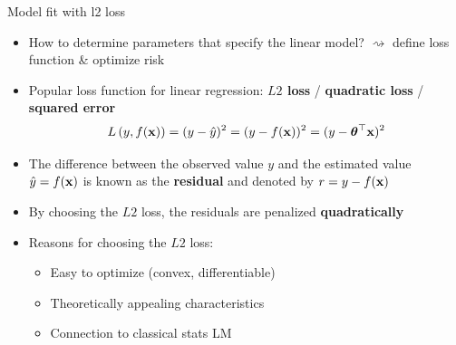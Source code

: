 \documentclass[11pt,compress,t,notes=noshow, xcolor=table]{beamer}
\begin{document}
\begin{vbframe}{Model fit with l2 loss}

\begin{itemize}
    \item How to determine parameters that specify the linear model? $\rightsquigarrow$ define loss function \& optimize risk
    \item Popular loss function for linear regression: \textbf{$L2$ loss} / \textbf{quadratic loss} / 
    \textbf{squared error}
    $$L\left(y, f(\mathbf{x})\right) = (y - \hat{y})^2 = (y-f(\mathbf{x}))^2 = (y-\bm{\theta}^\top \mathbf{x})^2$$
    
    \item The difference between the observed value $y$ and the estimated value $\hat{y} = f(\mathbf{x})$ is known as the \textbf{residual} and denoted by $r = y - f(\mathbf{x})$
    \item By choosing the $L2$ loss, the residuals are penalized \textbf{quadratically}
    \item Reasons for choosing the $L2$ loss:
    \begin{itemize}
        \item Easy to optimize (convex, differentiable)
        \item Theoretically appealing characteristics 
        \item Connection to classical stats LM
    \end{itemize}
\end{itemize}

\end{vbframe}

\end{document}
